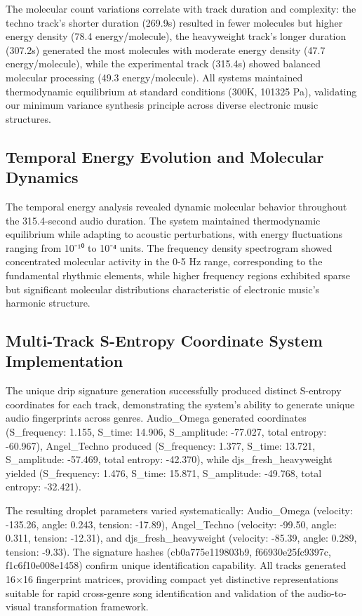 The molecular count variations correlate with track duration and complexity: the techno track's shorter duration (269.9s) resulted in fewer molecules but higher energy density (78.4 energy/molecule), the heavyweight track's longer duration (307.2s) generated the most molecules with moderate energy density (47.7 energy/molecule), while the experimental track (315.4s) showed balanced molecular processing (49.3 energy/molecule). All systems maintained thermodynamic equilibrium at standard conditions (300K, 101325 Pa), validating our minimum variance synthesis principle across diverse electronic music structures.

\subsection{Temporal Energy Evolution and Molecular Dynamics}

The temporal energy analysis revealed dynamic molecular behavior throughout the 315.4-second audio duration. The system maintained thermodynamic equilibrium while adapting to acoustic perturbations, with energy fluctuations ranging from 10⁻¹⁰ to 10⁻⁴ units. The frequency density spectrogram showed concentrated molecular activity in the 0-5 Hz range, corresponding to the fundamental rhythmic elements, while higher frequency regions exhibited sparse but significant molecular distributions characteristic of electronic music's harmonic structure.

\subsection{Multi-Track S-Entropy Coordinate System Implementation}

The unique drip signature generation successfully produced distinct S-entropy coordinates for each track, demonstrating the system's ability to generate unique audio fingerprints across genres. Audio\_Omega generated coordinates (S\_frequency: 1.155, S\_time: 14.906, S\_amplitude: -77.027, total entropy: -60.967), Angel\_Techno produced (S\_frequency: 1.377, S\_time: 13.721, S\_amplitude: -57.469, total entropy: -42.370), while djs\_fresh\_heavyweight yielded (S\_frequency: 1.476, S\_time: 15.871, S\_amplitude: -49.768, total entropy: -32.421).

The resulting droplet parameters varied systematically: Audio\_Omega (velocity: -135.26, angle: 0.243, tension: -17.89), Angel\_Techno (velocity: -99.50, angle: 0.311, tension: -12.31), and djs\_fresh\_heavyweight (velocity: -85.39, angle: 0.289, tension: -9.33). The signature hashes (cb0a775e119803b9, f66930e25fc9397c, f1c6f10e008e1458) confirm unique identification capability. All tracks generated 16×16 fingerprint matrices, providing compact yet distinctive representations suitable for rapid cross-genre song identification and validation of the audio-to-visual transformation framework.

